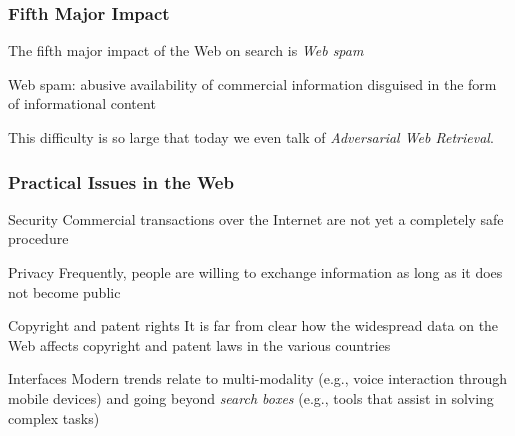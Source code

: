 \documentclass[svgnames]{beamer}
\begin{document}
\begin{frame}
    \frametitle{Fifth Major Impact}

    The fifth major impact of the Web on search is \emph{Web spam}

    \begin{block}{Web spam:} 
        abusive availability of commercial information disguised in the form of informational content
    \end{block}

    \vfill

    \begin{block}{}
        This difficulty is so large that today we even talk of \emph{Adversarial Web Retrieval}.
    \end{block}

\end{frame}


\begin{frame}
    \frametitle{Practical Issues in the Web}

    \small
    
    \begin{block}{Security}
        Commercial transactions over the Internet are not yet a completely safe procedure
    \end{block}


    \begin{block}{Privacy}
        Frequently, people are willing to exchange information as long as it does not become public
    \end{block}


    \begin{block}{ Copyright and patent rights}
        It is far from clear how the widespread data on the Web affects
        copyright and patent laws in the various countries
    \end{block}

    \begin{block}{Interfaces}
        Modern trends relate to multi-modality (e.g., voice interaction through mobile devices) and going beyond {\it search boxes} (e.g., tools that assist in solving complex tasks)
    \end{block}

\end{frame}



\end{document}
